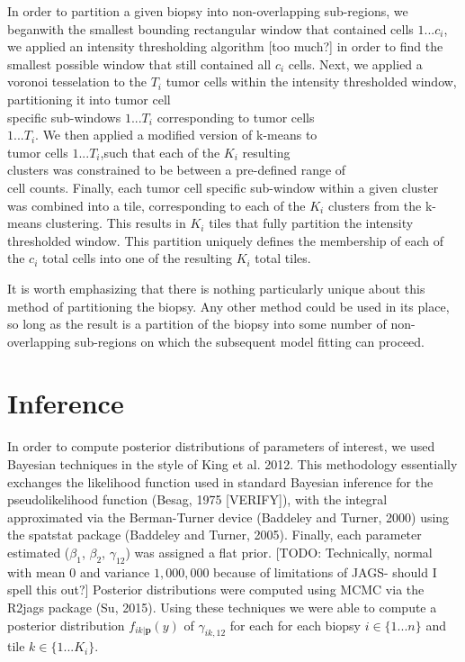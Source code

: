 \documentclass[
]{book}
\begin{document}
In order to partition a given biopsy into non-overlapping
sub-regions, we beganwith the smallest bounding rectangular
window that contained cells \(1...c_i\), we applied an intensity thresholding algorithm {[}too much?{]} in order to find the smallest
possible window that still contained all \(c_i\) cells. Next, we
applied a voronoi tesselation to the \(T_i\) tumor cells within the intensity thresholded window, partitioning it into tumor cell\\
specific sub-windows \(1...T_i\) corresponding to tumor cells\\
\(1...T_i\). We then applied a modified version of k-means to\\
tumor cells \(1...T_i\),such that each of the \(K_i\) resulting\\
clusters was constrained to be between a pre-defined range of\\
cell counts. Finally, each tumor cell specific sub-window within
a given cluster was combined into a tile, corresponding to each
of the \(K_i\) clusters from the k-means clustering. This results
in \(K_i\) tiles that fully partition the intensity thresholded
window. This partition uniquely defines the membership of each of
the \(c_i\) total cells into one of the resulting \(K_i\) total tiles.

It is worth emphasizing that there is nothing particularly unique
about this method of partitioning the biopsy. Any other method could
be used in its place, so long as the result is a partition of the
biopsy into some number of non-overlapping sub-regions on which the
subsequent model fitting can proceed.

\hypertarget{inference}{%
\section{Inference}\label{inference}}

In order to compute posterior distributions of parameters of
interest, we used Bayesian techniques in the style of King et al.
2012. This methodology essentially exchanges the likelihood
function used in standard Bayesian inference for the
pseudolikelihood function (Besag, 1975 {[}VERIFY{]}), with the
integral approximated via the Berman-Turner device (Baddeley
and Turner, 2000) using the spatstat package (Baddeley and Turner,
2005). Finally, each parameter estimated (\(\beta_1\), \(\beta_2\),
\(\gamma_{12}\)) was assigned a flat prior. {[}TODO: Technically,
normal with mean 0 and variance \(1,000,000\) because of limitations
of JAGS- should I spell this out?{]} Posterior distributions were
computed using MCMC via the R2jags package (Su, 2015). Using
these techniques we were able to compute a
posterior distribution \(f_{ik | \mathbf{p}}(y)\) of \(\gamma_{ik,12}\) for
each for each biopsy \(i \in \{1...n\}\) and tile
\(k \in \{1...K_i\}\).
\end{document}
